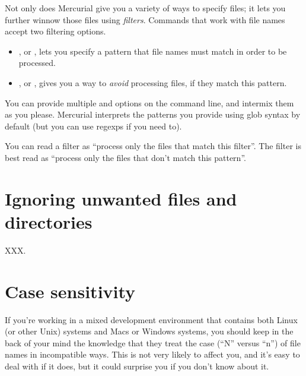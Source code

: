 Not only does Mercurial give you a variety of ways to specify files;
it lets you further winnow those files using \emph{filters}.  Commands
that work with file names accept two filtering options.
\begin{itemize}
\item {}, or , lets you specify a pattern
  that file names must match in order to be processed.
\item {}, or , gives you a way to
  \emph{avoid} processing files, if they match this pattern.
\end{itemize}
You can provide multiple  and  options on the
command line, and intermix them as you please.  Mercurial interprets
the patterns you provide using glob syntax by default (but you can use
regexps if you need to).

You can read a  filter as ``process only the files that
match this filter''.
The  filter is best read as ``process only the files that
don't match this pattern''.

\section{Ignoring unwanted files and directories}

XXX.

\section{Case sensitivity}
\label{sec:names:case}

If you're working in a mixed development environment that contains
both Linux (or other Unix) systems and Macs or Windows systems, you
should keep in the back of your mind the knowledge that they treat the
case (``N'' versus ``n'') of file names in incompatible ways.  This is
not very likely to affect you, and it's easy to deal with if it does,
but it could surprise you if you don't know about it.

